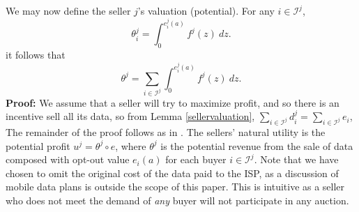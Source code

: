 \documentclass[12pt]{article}
\theoremstyle{definition}
\newcommand{\mcI}{\mathcal{I}}
\begin{document}
\begin{multicols}{2}
We may now define the seller $j$'s valuation (potential). 
{
\label{sellervaluation}
For any $i\in\mcI^j$, 
\begin{equation}
    \theta_i^j = \int_0^{e_i^j(a)} f^j(z) \ dz.
\end{equation}
it follows that 
\begin{equation}\label{valuation}
    \theta^j = \displaystyle\sum_{i\in\mcI^j}
 \int_0^{e_i^j(a)} f^j(z) \ dz.
\end{equation}
}
\textbf{Proof:} 
We assume that a seller will try to maximize profit, and
so there is an incentive sell all its data, so from Lemma
\ref{sellervaluation},  $\sum_{i\in{\mcI^j}} d_i^j = 
\sum_{i\in\mcI^j} e_i$,
The remainder of the proof follows as in \cite{semret}.
The sellers' natural utility is the potential
profit $u^j = \theta^j\circ e$, where $\theta^j$ is the
potential revenue from the sale of data composed with opt-out value
$e_i(a)$ for each buyer $i\in\mcI^j$. Note that we have chosen to omit the original cost of the data
paid to the ISP, as a discussion of mobile data plans is outside the scope of this
paper. This is intuitive as a seller who does not meet the demand of \emph{any} buyer will not
participate in any auction. 


\end{multicols}
\end{document}
